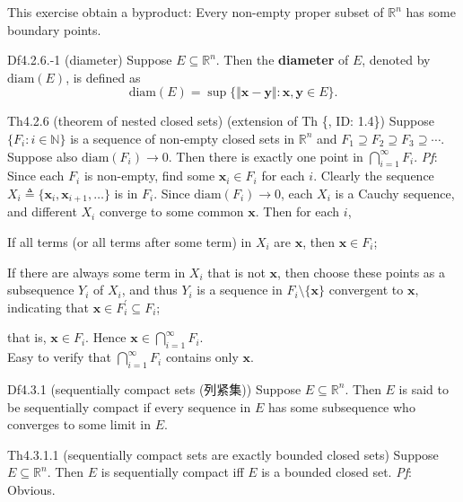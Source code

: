 \documentclass{article}
\begin{document}
\begin{Rmk}{}
    This exercise obtain a byproduct: \textcolor{Th}{Every non-empty proper subset of $\mathbb{R}^n$ has some boundary points.}
\end{Rmk}

\begin{Df}{Df4.2.6.-1 (diameter)}
    Suppose $E\subseteq\mathbb{R}^n$. Then the \textbf{diameter} of $E$, denoted by $\text{diam}(E)$, is defined as
    $$\text{diam}(E) = \sup\{\Vert\pmb{x}-\pmb{y}\Vert: \pmb{x}, \pmb{y}\in E\}.$$
\end{Df}

\begin{Th}{Th4.2.6 (theorem of nested closed sets) (extension of Th \{, ID: 1.4\})}
    Suppose $\{F_i: i\in\mathbb{N}\}$ is a sequence of non-empty closed sets in $\mathbb{R}^n$ and $F_1\supseteq F_2\supseteq F_3\supseteq \cdots$. Suppose also $\text{diam}(F_i)\rightarrow 0$. Then there is exactly one point in $\bigcap\limits_{i=1}^\infty F_i$.
    \tcblower
    \textit{Pf}: Since each $F_i$ is non-empty, find some $\pmb{x}_i\in F_i$ for each $i$. Clearly the sequence $X_i\triangleq\{\pmb{x}_i, \pmb{x}_{i+1}, \dots\}$ is in $F_i$. Since $\text{diam}(F_i)\rightarrow 0$, each $X_i$ is a Cauchy sequence, and different $X_i$ converge to some common $\pmb{x}$. Then for each $i$,
    \begin{compactenum}
        \item If all terms (or all terms after some term) in $X_i$ are $\pmb{x}$, then $\pmb{x}\in F_i$;
        \item If there are always some term in $X_i$ that is not $\pmb{x}$, then choose these points as a subsequence $Y_i$ of $X_i$, and thus $Y_i$ is a sequence in $F_i\setminus\{\pmb{x}\}$ convergent to $\pmb{x}$, indicating that $\pmb{x}\in F_i^\prime\subseteq F_i$;
    \end{compactenum}
    that is, $\pmb{x}\in F_i$. Hence $\pmb{x}\in\bigcap\limits_{i=1}^\infty F_i$.\\
    Easy to verify that $\bigcap\limits_{i=1}^\infty F_i$ contains only $\pmb{x}$.
\end{Th}

\begin{Df}{Df4.3.1 (sequentially compact sets (列紧集))}
    Suppose $E\subseteq\mathbb{R}^n$. Then $E$ is said to be sequentially compact if every sequence in $E$ has some subsequence who converges to some limit in $E$.
\end{Df}

\begin{Th}{Th4.3.1.1 (sequentially compact sets are exactly bounded closed sets)}
    Suppose $E\subseteq\mathbb{R}^n$. Then $E$ is sequentially compact iff $E$ is a bounded closed set.
    \tcblower
    \textit{Pf}: Obvious.
\end{Th}
\end{document}
